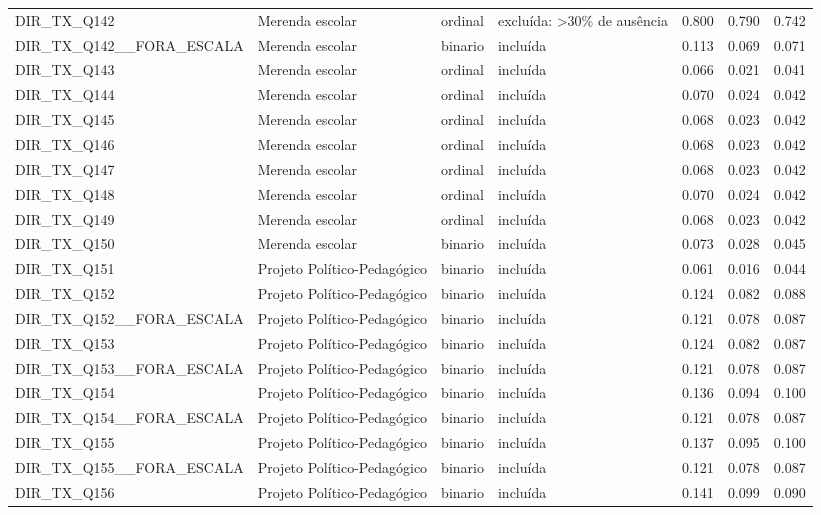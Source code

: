 \begin{tabular}{llllrrr}
DIR\_TX\_Q142 & Merenda escolar & ordinal & excluída: >30\% de ausência & 0.800 & 0.790 & 0.742 \\
DIR\_TX\_Q142\_\_FORA\_ESCALA & Merenda escolar & binario & incluída & 0.113 & 0.069 & 0.071 \\
DIR\_TX\_Q143 & Merenda escolar & ordinal & incluída & 0.066 & 0.021 & 0.041 \\
DIR\_TX\_Q144 & Merenda escolar & ordinal & incluída & 0.070 & 0.024 & 0.042 \\
DIR\_TX\_Q145 & Merenda escolar & ordinal & incluída & 0.068 & 0.023 & 0.042 \\
DIR\_TX\_Q146 & Merenda escolar & ordinal & incluída & 0.068 & 0.023 & 0.042 \\
DIR\_TX\_Q147 & Merenda escolar & ordinal & incluída & 0.068 & 0.023 & 0.042 \\
DIR\_TX\_Q148 & Merenda escolar & ordinal & incluída & 0.070 & 0.024 & 0.042 \\
DIR\_TX\_Q149 & Merenda escolar & ordinal & incluída & 0.068 & 0.023 & 0.042 \\
DIR\_TX\_Q150 & Merenda escolar & binario & incluída & 0.073 & 0.028 & 0.045 \\
DIR\_TX\_Q151 & Projeto Político-Pedagógico & binario & incluída & 0.061 & 0.016 & 0.044 \\
DIR\_TX\_Q152 & Projeto Político-Pedagógico & binario & incluída & 0.124 & 0.082 & 0.088 \\
DIR\_TX\_Q152\_\_FORA\_ESCALA & Projeto Político-Pedagógico & binario & incluída & 0.121 & 0.078 & 0.087 \\
DIR\_TX\_Q153 & Projeto Político-Pedagógico & binario & incluída & 0.124 & 0.082 & 0.087 \\
DIR\_TX\_Q153\_\_FORA\_ESCALA & Projeto Político-Pedagógico & binario & incluída & 0.121 & 0.078 & 0.087 \\
DIR\_TX\_Q154 & Projeto Político-Pedagógico & binario & incluída & 0.136 & 0.094 & 0.100 \\
DIR\_TX\_Q154\_\_FORA\_ESCALA & Projeto Político-Pedagógico & binario & incluída & 0.121 & 0.078 & 0.087 \\
DIR\_TX\_Q155 & Projeto Político-Pedagógico & binario & incluída & 0.137 & 0.095 & 0.100 \\
DIR\_TX\_Q155\_\_FORA\_ESCALA & Projeto Político-Pedagógico & binario & incluída & 0.121 & 0.078 & 0.087 \\
DIR\_TX\_Q156 & Projeto Político-Pedagógico & binario & incluída & 0.141 & 0.099 & 0.090 \\

\end{tabular}
